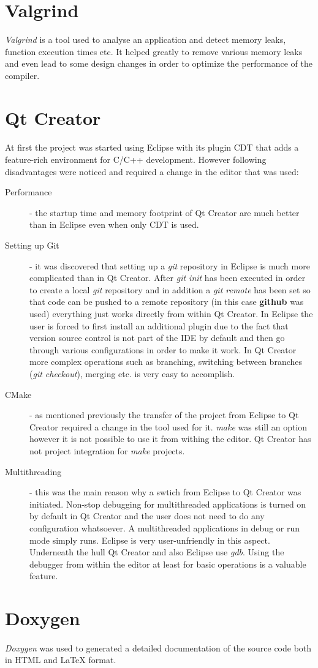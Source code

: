 	\section{Valgrind}
		\textit{Valgrind} is a tool used to analyse an application and detect memory leaks, function execution times etc. It helped greatly to remove various memory leaks and even lead to some design changes in order to optimize the performance of the compiler.
	\section{Qt Creator}
	\label{sec:qtcreator}
	\paragraph{}
		At first the project was started using Eclipse with its plugin CDT that adds a feature-rich environment for C/C++ development. However following disadvantages were noticed and required a change in the editor that was used:
		\begin{description}
			\item[Performance] - the startup time and memory footprint of Qt Creator are much better than in Eclipse even when only CDT is used.
			\item[Setting up Git] - it was discovered that setting up a \textit{git} repository in Eclipse is much more complicated than in Qt Creator. After \textit{git init} has been executed in order to create a local \textit{git} repository and in addition a \textit{git remote} has been set so that code can be pushed to a remote repository (in this case \textbf{github} was used) everything just works directly from within Qt Creator. In Eclipse the user is forced to first install an additional plugin due to the fact that version source control is not part of the IDE by default and then go through various configurations in order to make it work. In Qt Creator more complex operations such as branching, switching between branches (\textit{git checkout}), merging etc. is very easy to accomplish.
			\item[CMake] - as mentioned previously the transfer of the project from Eclipse to Qt Creator required a change in the tool used for it. \textit{make} was still an option however it is not possible to use it from withing the editor. Qt Creator has not project integration for \textit{make} projects.
			\item[Multithreading] - this was the main reason why a swtich from Eclipse to Qt Creator was initiated. Non-stop debugging for multithreaded applications is turned on by default in Qt Creator and the user does not need to do any configuration whatsoever. A multithreaded applications in debug or run mode simply runs. Eclipse is very user-unfriendly in this aspect. Underneath the hull Qt Creator and also Eclipse use \textit{gdb}. Using the debugger from within the editor at least for basic operations is a valuable feature.
		\end{description}
	\section{Doxygen}
	\paragraph{}
		\textit{Doxygen} was used to generated a detailed documentation of the source code both in HTML and LaTeX format.